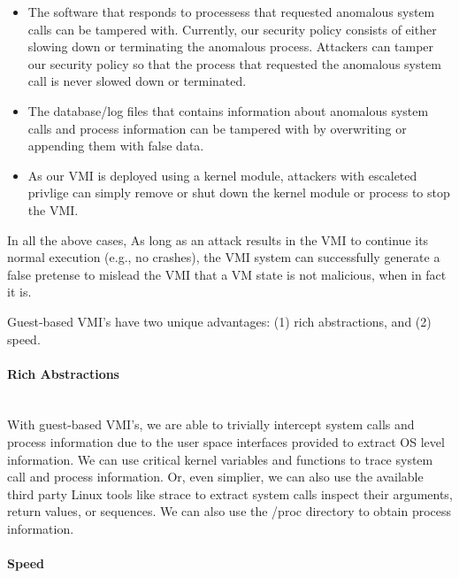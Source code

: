 \documentclass{report}
\begin{document}
\begin{spacing}{1.5}
{\begin{itemize}
\item The software that responds to processess that requested anomalous system calls can be tampered with. Currently, our security policy consists of either slowing down or terminating the anomalous process. Attackers can tamper our security policy so that the process that requested the anomalous system call is never slowed down or terminated.

\item The database/log files that contains information about anomalous system calls and process information can be tampered with by overwriting or appending them with false data. 


\item As our VMI is deployed using a kernel module, attackers with escaleted privlige can simply remove or shut down the kernel module or process to stop the VMI.
\end{itemize}
}

{\large
In all the above cases, As long as an attack results in the VMI to continue its normal execution (e.g., no crashes), the VMI system can successfully generate a false pretense to mislead the VMI that a VM state is not malicious, when in fact it is.
\newline
}


{\large
Guest-based VMI's have two unique advantages: (1) rich abstractions, and (2) speed. 
\newline
}

\paragraph{Rich Abstractions}\mbox{}\\

{\large
With guest-based VMI's, we are able to trivially intercept system calls and process information due to the user space interfaces provided to extract OS level information. We can use critical kernel variables and functions to trace system call and process information. Or, even simplier, we can also use the available third party Linux tools like strace to extract system calls inspect their arguments, return values, or sequences. We can also use the /proc directory to obtain process information.
\newline
}

\paragraph{Speed}\mbox{}\\


\end{spacing}
\end{document}
